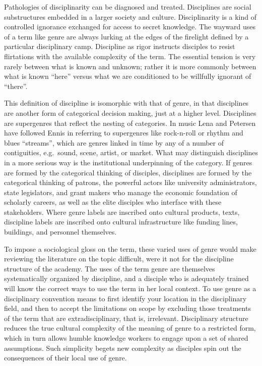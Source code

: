 \documentclass[]{book}
\theoremstyle{definition}
\theoremstyle{definition}
\theoremstyle{definition}
\theoremstyle{remark}
\begin{document}
Pathologies of disciplinarity can be diagnosed and treated. Disciplines
are social substructures embedded in a larger society and culture.
Disciplinarity is a kind of controlled ignorance exchanged for access to
secret knowledge. The wayward uses of a term like genre are always
lurking at the edges of the firelight defined by a particular
disciplinary camp. Discipline as rigor instructs disciples to resist
flirtations with the available complexity of the term. The essential
tension is very rarely between what is known and unknown; rather it is
more commonly between what is known ``here'' versus what we are
conditioned to be willfully ignorant of ``there''.

This definition of discipline is isomorphic with that of genre, in that
disciplines are another form of categorical decision making, just at a
higher level. Disciplines are supergenres that reflect the nesting of
categories. In music Lena and Petersen
\citeyearpar[698]{Lena2008Classification} have followed Ennis
\citeyearpar{Ennis1992seventh} in referring to supergenres like
rock-n-roll or rhythm and blues ``streams'', which are genres linked in
time by any of a number of contiguities, e.g.~sound, scene, artist, or
market. What may distinguish disciplines in a more serious way is the
institutional underpinning of the category. If genres are formed by the
categorical thinking of disciples, disciplines are formed by the
categorical thinking of patrons, the powerful actors like university
administrators, state legislators, and grant makers who manage the
economic foundation of scholarly careers, as well as the elite disciples
who interface with these stakeholders. Where genre labels are inscribed
onto cultural products, texts, discipline labels are inscribed onto
cultural infrastructure like funding lines, buildings, and personnel
themselves.

To impose a sociological gloss on the term, these varied uses of genre
would make reviewing the literature on the topic difficult, were it not
for the discipline structure of the academy. The uses of the term genre
are themselves systematically organized by discipline, and a disciple
who is adequately trained will know the correct ways to use the term in
her local context. To use genre as a disciplinary convention means to
first identify your location in the disciplinary field, and then to
accept the limitations on scope by excluding those treatments of the
term that are extradisciplinary, that is, irrelevant. Disciplinary
structure reduces the true cultural complexity of the meaning of genre
to a restricted form, which in turn allows humble knowledge workers to
engage upon a set of shared assumptions. Such simplicity begets new
complexity as disciples spin out the consequences of their local use of
genre.
\end{document}
